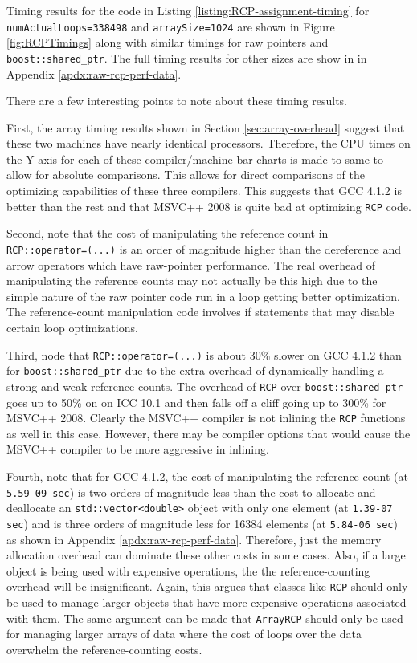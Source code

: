 \documentclass[pdf,ps2pdf,11pt]{SANDreport}
\begin{document}
Timing results for the code in Listing
{}\ref{listing:RCP-assignment-timing} for
{}\texttt{numActualLoops=338498} and {}\texttt{arraySize=1024} are
shown in Figure {}\ref{fig:RCPTimings} along with similar timings for
raw pointers and {}\texttt{boost::shared\_ptr}.  The full timing
results for other sizes are show in in Appendix
{}\ref{apdx:raw-rcp-perf-data}.

There are a few interesting points to note about these timing results.

First, the array timing results shown in Section
{}\ref{sec:array-overhead} suggest that these two machines have nearly
identical processors.  Therefore, the CPU times on the Y-axis for each
of these compiler/machine bar charts is made to same to allow for
absolute comparisons.  This allows for direct comparisons of the
optimizing capabilities of these three compilers.  This suggests that
GCC 4.1.2 is better than the rest and that MSVC++ 2008 is quite bad at
optimizing {}\texttt{RCP} code.

Second, note that the cost of manipulating the reference count in
{}\texttt{RCP::operator=(...)} is an order of magnitude higher than
the dereference and arrow operators which have raw-pointer
performance.  The real overhead of manipulating the reference counts
may not actually be this high due to the simple nature of the raw
pointer code run in a loop getting better optimization.  The
reference-count manipulation code involves if statements that may
disable certain loop optimizations.

Third, node that {}\texttt{RCP::operator=(...)} is about 30\% slower
on GCC 4.1.2 than for {}\texttt{boost::shared\_ptr} due to the extra
overhead of dynamically handling a strong and weak reference counts.
The overhead of {}\texttt{RCP} over {}\texttt{boost::shared\_ptr} goes
up to 50\% on on ICC 10.1 and then falls off a cliff going up to 300\%
for MSVC++ 2008.  Clearly the MSVC++ compiler is not inlining the
{}\texttt{RCP} functions as well in this case.  However, there may be
compiler options that would cause the MSVC++ compiler to be more
aggressive in inlining.

Fourth, note that for GCC 4.1.2, the cost of manipulating the
reference count (at {}\texttt{5.59-09 sec}) is two orders of magnitude
less than the cost to allocate and deallocate an
{}\texttt{std::vector<double>} object with only one element (at
{}\texttt{1.39-07 sec}) and is three orders of magnitude less for
16384 elements (at {}\texttt{5.84-06 sec}) as shown in Appendix
{}\ref{apdx:raw-rcp-perf-data}.  Therefore, just the memory allocation
overhead can dominate these other costs in some cases.  Also, if a
large object is being used with expensive operations, the the
reference-counting overhead will be insignificant.  Again, this argues
that classes like {}\texttt{RCP} should only be used to manage larger
objects that have more expensive operations associated with them.  The
same argument can be made that {}\texttt{ArrayRCP} should only be used
for managing larger arrays of data where the cost of loops over the
data overwhelm the reference-counting costs.
\end{document}
